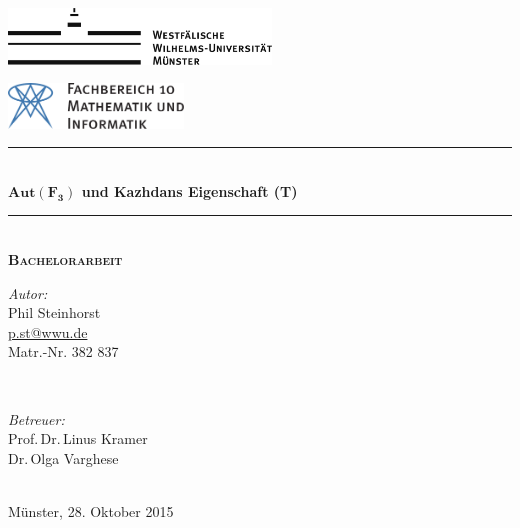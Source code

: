 \begin{titlepage}
	\newcommand{\HRule}{\rule{\linewidth}{0.8mm}}

	\center
 
	\begin{minipage}{0.4\textwidth}
	\begin{flushleft}
	\includegraphics[height=1.5cm,keepaspectratio]{img/wwulogo.pdf}\\[1cm]
	\end{flushleft}
	\end{minipage}
	\hfill
	\begin{minipage}{0.4\textwidth}
	\begin{flushright}
	\vspace*{0.3cm}
	\includegraphics[height=1.2cm,keepaspectratio]{img/fb10logo.pdf} \
	\end{flushright}
	\end{minipage}

	\vspace{2cm}
	
	\HRule \\[0.8cm]
	{ \huge \sffamily\bfseries $\mathbf{Aut}\boldsymbol{(F_3)}$ und Kazhdans Eigenschaft (T)}\\[0.4cm] %
	\HRule \\[1cm]
 
	\textsc{\LARGE \textbf{Bachelorarbeit}}\\[5cm]

	\vfill

	\begin{minipage}{0.4\textwidth}
	\begin{flushleft} \large
	\emph{Autor:}\\
	Phil Steinhorst\\
	\url{p.st@wwu.de}\\
	Matr.-Nr. 382 837
	\end{flushleft}
	\end{minipage}
	~
	\begin{minipage}{0.4\textwidth}
	\begin{flushright} \large
	\emph{Betreuer:} \\
	Prof.\,Dr.\,Linus Kramer\\
	Dr.\,Olga Varghese\\
	\phantom{bla}
	\end{flushright}
	\end{minipage}\\[2cm]

	{\large Münster, 28. Oktober 2015}
\end{titlepage}